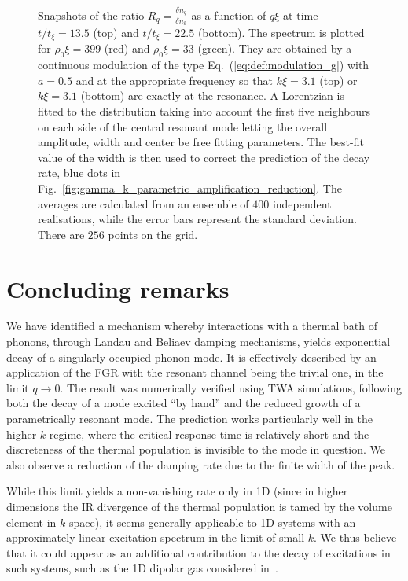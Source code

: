 \documentclass[aps,prd,notitlepage,amsfonts,amssymb,amsmath,nofootinbib,superscriptaddress,longbibliography]{revtex4-2}
\begin{document}
\begin{figure}
\begin{minipage}{0.49\textwidth}
    \end{minipage}
    \caption{Snapshots of the ratio $R_{q} = \frac{\delta n_q}{\delta n_k}$ as a function of $q \xi$ at time $t/t_{\xi}=13.5$ (top) and $t/t_{\xi} = 22.5$ (bottom). The spectrum is plotted for  $\rho_0 \xi = 399$ (red) and $\rho_0 \xi = 33$ (green).
    They are obtained by a continuous modulation of the type Eq.~(\ref{eq:def:modulation_g}) with $a =0.5$ and at the appropriate frequency so that $k \xi = 3.1$ (top) or $k \xi = 3.1$ (bottom) are exactly at the resonance. A Lorentzian is fitted to the distribution taking into account the first five neighbours on each side of the central resonant mode letting the overall amplitude, width and center be free fitting parameters. The best-fit value of the width is then used to correct the prediction of the decay rate, blue dots in Fig.~\ref{fig:gamma_k_parametric_amplification_reduction}. The averages are calculated from an ensemble of $400$ independent realisations, while the error bars represent the standard deviation. There are $256$ points on the grid.
    \label{fig:Rq_spectrum_different_asap}
    }
\end{figure}


\section{Concluding remarks}
\label{sec:Conclusion}

We have identified a mechanism whereby interactions with a thermal bath of phonons, through Landau and Beliaev damping mechanisms, yields exponential decay of a singularly occupied phonon mode. 
It is effectively described by an application of the FGR with the resonant channel being the trivial one, in the limit $q \to 0$. 
The result was numerically verified using TWA simulations, following both the decay of a mode excited ``by hand'' and the reduced growth of a parametrically resonant mode.  The prediction works particularly well in the higher-$k$ regime, where the critical response time is relatively short and the discreteness of the thermal population is invisible to the mode in question.  
We also observe a reduction of the damping rate due to the finite width of the peak.

While this limit yields a non-vanishing rate only in 1D (since in higher dimensions the IR divergence of the thermal population is tamed by the volume element in $k$-space), it seems generally applicable to 1D systems with an approximately linear excitation spectrum in the limit of small $k$.   We thus believe that it could appear as an additional contribution to the decay of excitations in such systems, such as the 1D dipolar gas considered in~\cite{Kurkjian-Ristivojevic-2020}.
\end{document}
